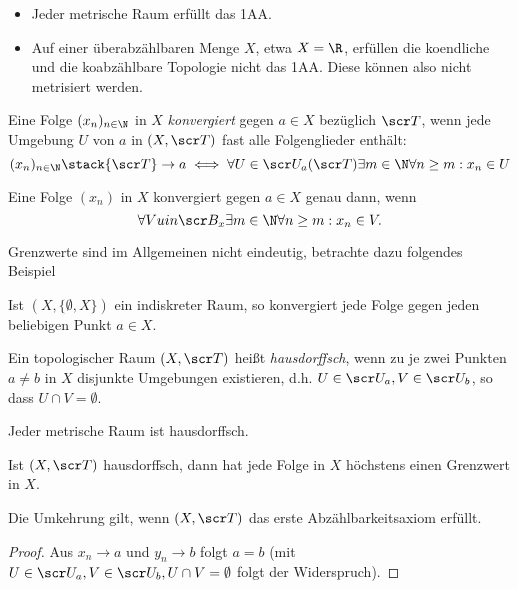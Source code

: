 \begin{ex}
	\begin{itemize}
		\item
			Jeder metrische Raum erfüllt das 1AA.
		\item
			Auf einer überabzählbaren Menge $X$, etwa $X = \R$, erfüllen die koendliche und die koabzählbare Topologie nicht das 1AA.
			Diese können also nicht metrisiert werden.
	\end{itemize}
\end{ex}

\begin{df}
	Eine Folge $(x_n)_{n\in \N}$ in $X$ \emph{konvergiert} gegen $a \in X$ bezüglich $\scr T$, wenn jede Umgebung $U$ von $a$ in $(X, \scr T)$ fast alle Folgenglieder enthält:
	\[
		(x_n)_{n\in \N} \stack{\scr T}\to a
		\iff
		\forall U \in \scr U_a(\scr T) \exists m \in \N \forall n \ge m : x_n \in U
	\]
\end{df}

\begin{prop}
	Eine Folge $(x_n)$ in $X$ konvergiert gegen $a \in X$ genau dann, wenn
	\[
		\forall V uin \scr B_x \exists m \in \N \forall n \ge m : x_n \in V.
	\]
\end{prop}

Grenzwerte sind im Allgemeinen nicht eindeutig, betrachte dazu folgendes Beispiel

\begin{ex}
	Ist $(X, \{\emptyset, X\})$ ein indiskreter Raum, so konvergiert jede Folge gegen jeden beliebigen Punkt $a \in X$.
\end{ex}

\begin{df}
	Ein topologischer Raum $(X, \scr T)$ heißt \emph{hausdorffsch}, wenn zu je zwei Punkten $a \neq b$ in $X$ disjunkte Umgebungen existieren, d.h. $U \in \scr U_a, V \in \scr U_b$, so dass $U \cap V = \emptyset$.
\end{df}

\begin{ex}
	Jeder metrische Raum ist hausdorffsch.
\end{ex}

\begin{st}
	Ist $(X,\scr T)$ hausdorffsch, dann hat jede Folge in $X$ höchstens einen Grenzwert in $X$.

	Die Umkehrung gilt, wenn $(X, \scr T)$ das erste Abzählbarkeitsaxiom erfüllt.
	\begin{proof}
		Aus $x_n \to a$ und $y_n \to b$ folgt $a = b$ (mit $U \in \scr U_a, V \in \scr U_b, U \cap V = \emptyset$ folgt der Widerspruch).
	\end{proof}
\end{st}
